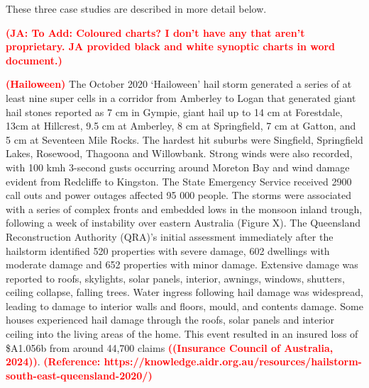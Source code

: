 \documentclass[]{agujournal2019}\usepackage[]{graphicx}\usepackage[]{xcolor}
\newcommand*{\todo}[1]{\textbf{\textcolor{red}{(#1)}}}
\begin{document}
These three case studies are described in more detail below.

\todo{JA: To Add: Coloured charts? I don’t have any that aren’t proprietary. JA
provided black and white synoptic charts in word document.}

\todo{Hailoween} The October 2020 ‘Hailoween’ hail storm generated a series of
at least nine super cells in a corridor from Amberley to Logan that generated
giant hail stones reported as 7 cm in Gympie, giant hail up to 14 cm at
Forestdale, 13cm at Hillcrest, 9.5 cm at Amberley, 8 cm at Springfield, 7 cm at
Gatton, and 5 cm at Seventeen Mile Rocks. The hardest hit suburbs were
Singfield, Springfield Lakes, Rosewood, Thagoona and Willowbank. Strong winds
were also recorded, with 100 kmh 3-second gusts occurring around Moreton Bay and
wind damage evident from Redcliffe to Kingston. The State Emergency Service
received 2900 call outs and power outages affected 95 000 people. The storms
were associated with a series of complex fronts and embedded lows in the monsoon
inland trough, following a week of instability over eastern Australia (Figure
X). The Queensland Reconstruction Authority (QRA)’s initial assessment
immediately after the hailstorm identified 520 properties with severe damage,
602 dwellings with moderate damage and 652 properties with minor damage.
Extensive damage was reported to roofs, skylights, solar panels, interior,
awnings, windows, shutters, ceiling collapse, falling trees. Water ingress
following hail damage was widespread, leading to damage to interior walls and
floors, mould, and contents damage. Some houses experienced hail damage through
the roofs, solar panels and interior ceiling into the living areas of the home.
This event resulted in an insured loss of \$A1.056b from around  44,700 claims
\todo{(Insurance Council of Australia, 2024)}. \todo{Reference:
https://knowledge.aidr.org.au/resources/hailstorm-south-east-queensland-2020/}
\end{document}
